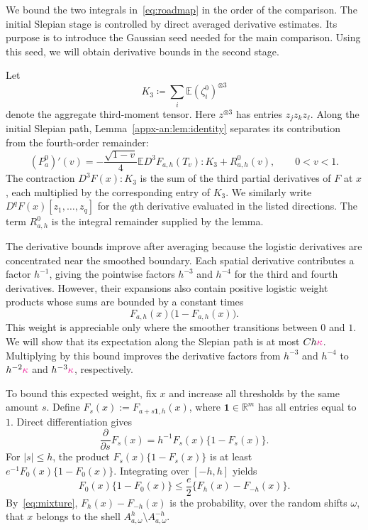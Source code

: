 \documentclass[11pt,letterpaper]{article}
\newcommand{\vSix}[1]{{\color{magenta}#1}}
\theoremstyle{remark}
\newcommand{\E}{\mathbb E}
\newcommand{\R}{\mathbb R}
\begin{document}
{
We bound the two integrals in~\eqref{eq:roadmap} in the order of the
comparison. {The initial Slepian stage is controlled by direct averaged derivative estimates.} Its purpose is to introduce
the Gaussian seed needed for the main comparison. {Using this seed, we will obtain derivative bounds in the second stage.}

Let
\[
 K_3\coloneqq\sum_i\E(\zeta_i^0)^{\otimes3}
\]
denote the aggregate third-moment tensor.
{
Here \(z^{\otimes3}\) has entries \(z_jz_kz_\ell\).
}
Along the initial Slepian path,
Lemma~\ref{appx-an:lem:identity} separates its contribution from the
fourth-order remainder:
\[
 (P_a^0)'(v)
 =-\frac{\sqrt{1-v}}4\E D^3F_{a,h}(T_v):K_3+R^0_{a,h}(v),
 \qquad 0<v<1.
\]
{
The contraction \(D^3F(x):K_3\) is the sum of the third partial
derivatives of \(F\) at \(x\), each multiplied by the corresponding
entry of \(K_3\). We similarly write
\(D^qF(x)[z_1,\ldots,z_q]\) for the \(q\)th derivative evaluated in
the listed directions. The term \(R^0_{a,h}\) is the integral
remainder supplied by the lemma.
}

{
The derivative bounds improve after averaging because the logistic
 derivatives are concentrated near the smoothed boundary. Each spatial
 derivative contributes a factor \(h^{-1}\), giving the pointwise factors
 \(h^{-3}\) and \(h^{-4}\) for the third and fourth derivatives.
 However, their expansions also contain positive logistic weight products
 whose sums are bounded by a constant times
\[
 F_{a,h}(x)\bigl(1-F_{a,h}(x)\bigr).
\]
This weight is appreciable only where the smoother transitions between
\(0\) and \(1\). We will show that its expectation along the Slepian
path is at most \(Ch\vSix{\kappa}\). Multiplying by this bound improves the
 derivative factors from \(h^{-3}\) and \(h^{-4}\) to
\(h^{-2}\vSix{\kappa}\) and \(h^{-3}\vSix{\kappa}\), respectively.

{
To bound this expected weight, fix \(x\) and increase all thresholds
by the same amount \(s\). Define
\(F_s(x):=F_{a+s\mathbf1,h}(x)\), where \(\mathbf1\in\R^m\)
has all entries equal to \(1\). Direct differentiation gives
\[
 \frac{\partial}{\partial s}F_s(x)
 =h^{-1}F_s(x)\{1-F_s(x)\}.
\]
For \(|s|\le h\), the product \(F_s(x)\{1-F_s(x)\}\) is at least
\(e^{-1}F_0(x)\{1-F_0(x)\}\). Integrating over \([-h,h]\) yields
\[
 F_0(x)\{1-F_0(x)\}
 \le \frac e2\{F_h(x)-F_{-h}(x)\}.
\]
By~\eqref{eq:mixture}, \(F_h(x)-F_{-h}(x)\) is the probability,
over the random shifts \(\omega\), that \(x\) belongs to the shell
\(A_{a,\omega}^{h}\setminus A_{a,\omega}^{-h}\).

}}}
\end{document}
